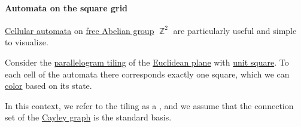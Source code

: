 \paragraph{Automata on the square grid}

\begin{remark}\label{rem:automata_on_square_grid}
  \hyperref[def:cellular_automaton]{Cellular automata} on \hyperref[def:free_abelian_group]{free Abelian group} \( \BbbZ^2 \) are particularly useful and simple to visualize.

  Consider the \hyperref[def:parallelogram_tiling]{parallelogram tiling} of the \hyperref[def:euclidean_plane]{Euclidean plane} with \hyperref[def:unit_hypercube]{unit square}. To each cell of the automata there corresponds exactly one square, which we can \hyperref[def:set_coloring]{color} based on its state.

  In this context, we refer to the tiling as a , and we assume that the connection set of the \hyperref[def:cayley_graph]{Cayley graph} is the standard basis.
\end{remark}

